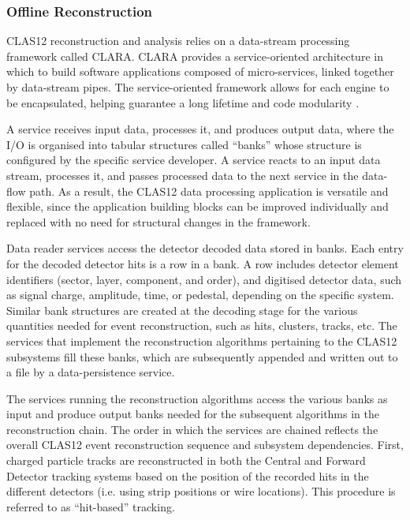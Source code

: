 \subsubsection{Offline Reconstruction} \label{sssec::offlinereconstruction}
    CLAS12 reconstruction and analysis relies on a data-stream processing framework called CLARA.
    CLARA provides a service-oriented architecture in which to build software applications composed of micro-services, linked together by data-stream pipes.
    The service-oriented framework allows for each engine to be encapsulated, helping guarantee a long lifetime and code modularity \cite{gyurgyan2016}.

    A service receives input data, processes it, and produces output data, where the I/O is organised into tabular structures called ``banks'' whose structure is configured by the specific service developer.
    A service reacts to an input data stream, processes it, and passes processed data to the next service in the data-flow path.
    As a result, the CLAS12 data processing application is versatile and flexible, since the application building blocks can be improved individually and replaced with no need for structural changes in the framework.

    Data reader services access the detector decoded data stored in banks.
    Each entry for the decoded detector hits is a row in a bank.
    A row includes detector element identifiers (sector, layer, component, and order), and digitised detector data, such as signal charge, amplitude, time, or pedestal, depending on the specific system.
    Similar bank structures are created at the decoding stage for the various quantities needed for event reconstruction, such as hits, clusters, tracks, etc.
    The services that implement the reconstruction algorithms pertaining to the CLAS12 subsystems fill these banks, which are subsequently appended and written out to a file by a data-persistence service.

    The services running the reconstruction algorithms access the various banks as input and produce output banks needed for the subsequent algorithms in the reconstruction chain.
    The order in which the services are chained reflects the overall CLAS12 event reconstruction sequence and subsystem dependencies.
    First, charged particle tracks are reconstructed in both the Central and Forward Detector tracking systems based on the position of the recorded hits in the different detectors (i.e. using strip positions or wire locations).
    This procedure is referred to as ``hit-based'' tracking.

